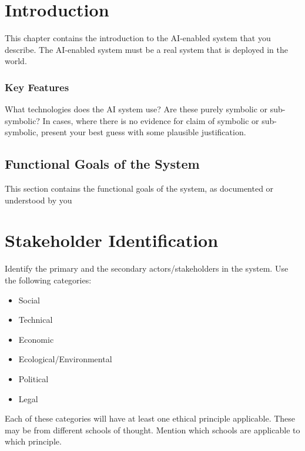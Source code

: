 \documentclass[]
{UCD_CS_41820_Report}
\begin{document}
\maketitle


\tableofcontents


\chapter{Introduction}
This chapter contains the introduction to the AI-enabled system that you describe. The AI-enabled system must be a real system that is deployed in the world.


\subsection*{Key Features}
What technologies does the AI system use? Are these purely symbolic or sub-symbolic? In cases, where there is no evidence for claim of symbolic or sub-symbolic, present your best guess with some plausible justification.


\section{Functional Goals of the System}
This section contains the functional goals of the system, as documented or understood by you


\chapter{Stakeholder Identification}
Identify the primary and the secondary actors/stakeholders in the system. Use the following categories:
\begin{itemize}
    \item Social
    \item Technical
    \item Economic
    \item Ecological/Environmental
    \item Political
    \item Legal
\end{itemize}

Each of these categories will have at least one ethical principle applicable. These may be from different schools of thought. Mention which schools are applicable to which principle.
\end{document}
